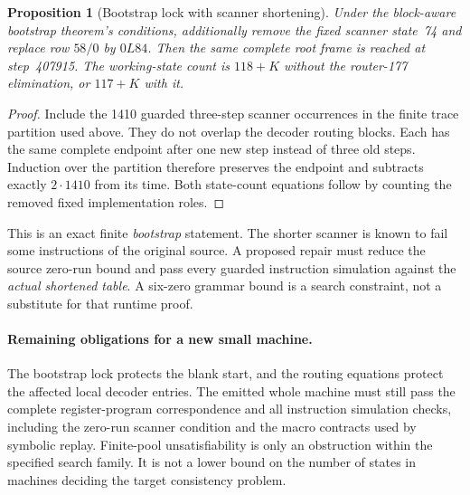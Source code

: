 \documentclass[11pt]{article}
\newtheorem{proposition}[lemma]{Proposition}
\begin{document}
\begin{proposition}[Bootstrap lock with scanner shortening]
Under the block-aware bootstrap theorem's conditions, additionally remove
the fixed scanner state~74 and replace row $58/0$ by $0L84$. Then the
same complete root frame is reached at step~407915. The working-state
count is $118+K$ without the router-177 elimination, or $117+K$ with it.
\end{proposition}

\begin{proof}
Include the 1410 guarded three-step scanner occurrences in the finite trace
partition used above. They do not overlap the decoder routing blocks.
Each has the same complete endpoint after one new step instead of three
old steps. Induction over the partition therefore preserves the endpoint
and subtracts exactly $2\cdot1410$ from its time. Both state-count equations
follow by counting the removed fixed implementation roles.
\end{proof}

This is an exact finite \emph{bootstrap} statement. The shorter scanner is
known to fail some instructions of the original source. A proposed repair
must reduce the source zero-run bound and pass every guarded instruction
simulation against the \emph{actual shortened table}. A six-zero grammar
bound is a search constraint, not a substitute for that runtime proof.

\paragraph{Remaining obligations for a new small machine.}
The bootstrap lock protects the blank start, and the routing equations
protect the affected local decoder entries. The emitted whole machine must
still pass the complete register-program correspondence and all instruction
simulation checks, including the zero-run scanner condition and the macro
contracts used by symbolic replay. Finite-pool unsatisfiability is only an
obstruction within the specified search family. It is not a lower bound
on the number of states in machines deciding the target consistency problem.
\end{document}
